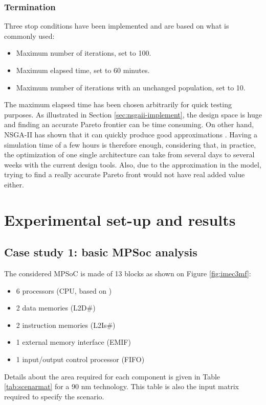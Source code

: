 \subsubsection{Termination}
\label{sec:termination}
Three stop conditions have been implemented and are based on what is commonly used:
\begin{itemize}
\item Maximum number of iterations, set to 100.
\item Maximum elapsed time, set to 60 minutes.
\item Maximum number of iterations with an unchanged population, set to 10.
\end{itemize}
The maximum elapsed time has been chosen arbitrarily for quick testing purposes. As illustrated in Section \ref{sec:nsgaii-implement}, the design space is huge and finding an accurate Pareto frontier can be time consuming. On other hand, NSGA-II has shown that it can quickly produce good approximations \cite{Deb00afast}. Having a simulation time of a few hours is therefore enough, considering that, in practice, the optimization of one single architecture can take from several days to several weeks with the current design tools. Also, due to the approximation in the model, trying to find a really accurate Pareto front would not have real added value either.

\section{Experimental set-up and results}
\subsection{Case study 1: basic MPSoc analysis}
\label{sec:casestudy}
The considered MPSoC is made of 13 blocks as shown on Figure \ref{fig:imec3mf}:
\begin{itemize}
\item 6 processors (CPU, based on \cite{conf/fpl/VeredasSMM05})
\item 2 data memories (L2D\#)
\item 2 instruction memories (L2Is\#)
\item 1 external memory interface (EMIF)
\item 1 input/output control processor (FIFO)
\end{itemize}
Details about the area required for each component is given in Table \ref{tab:scenarmat} for a 90 nm technology. This table is also the input matrix required to specify the scenario.

